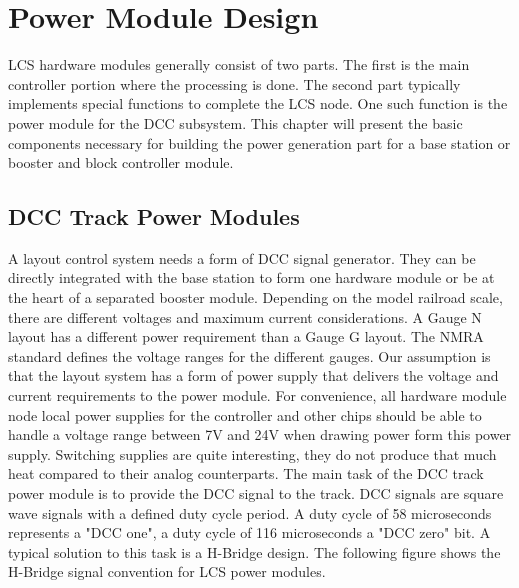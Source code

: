 \chapter{Power Module Design}

LCS hardware modules generally consist of two parts. The first is the main controller portion where the processing is done. The second part typically implements special functions to complete the LCS node. One such function is the power module for the DCC subsystem. This chapter will present the basic components necessary for building the power generation part for a base station or booster and block controller module.

\section{DCC Track Power Modules}

A layout control system needs a form of DCC signal generator. They can be directly integrated with the base station to form one hardware module or be at the heart of a separated booster module. Depending on the model railroad scale, there are different voltages and maximum current considerations. A Gauge N layout has a different power requirement than a Gauge G layout. The NMRA standard defines the voltage ranges for the different gauges. Our assumption is that the layout system has a form of power supply that delivers the voltage and current requirements to the power module. For convenience, all hardware module node local power supplies for the controller and other chips should be able to handle a voltage range between 7V and 24V when drawing power form this power supply. Switching supplies are quite interesting, they do not produce that much heat compared to their analog counterparts. The main task of the DCC track power module is to provide the DCC signal to the track. DCC signals are square wave signals with a defined duty cycle period. A duty cycle of 58 microseconds represents a "DCC one", a duty cycle of 116 microseconds a "DCC zero" bit. A typical solution to this task is a H-Bridge design. The following figure shows the H-Bridge signal convention for LCS power modules.


